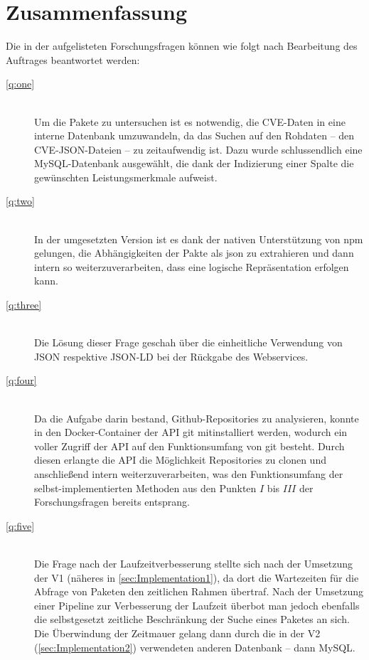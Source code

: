 \section{Zusammenfassung} \label{sec:Zusammenfassung}
    Die in der  aufgelisteten Forschungsfragen können wie folgt nach Bearbeitung des Auftrages beantwortet werden:
    \begin{description}
        \item[\ref{q:one}]\hfill \\
            Um die Pakete zu untersuchen ist es notwendig, die CVE-Daten in eine interne Datenbank umzuwandeln, da das Suchen auf den Rohdaten -- den CVE-\ac{JSON}-Dateien -- zu zeitaufwendig ist.
            Dazu wurde schlussendlich eine MySQL-Datenbank ausgewählt, die dank der Indizierung einer Spalte die gewünschten Leistungsmerkmale aufweist.
        \item[\ref{q:two}]\hfill \\
            In der umgesetzten Version ist es dank der nativen Unterstützung von npm gelungen, die Abhängigkeiten der Pakte als json zu extrahieren und dann intern so weiterzuverarbeiten, dass eine logische Repräsentation erfolgen kann.
        \item[\ref{q:three}]\hfill \\
            Die Lösung dieser Frage geschah über die einheitliche Verwendung von \ac{JSON} respektive \ac{JSON-LD} bei der Rückgabe des Webservices.
        \item[\ref{q:four}]\hfill \\
            Da die Aufgabe darin bestand, Github-Repositories zu analysieren, konnte in den Docker-Container der API git mitinstalliert werden, wodurch ein voller Zugriff der API auf den Funktionsumfang von git besteht.
            Durch diesen erlangte die \ac{API} die Möglichkeit Repositories zu clonen und anschließend intern weiterzuverarbeiten, was den Funktionsumfang der selbst-implementierten Methoden aus den Punkten $I$ bis $III$ der Forschungsfragen bereits entsprang.
        \item[\ref{q:five}]\hfill \\
            Die Frage nach der Laufzeitverbesserung stellte sich nach der Umsetzung der V1 (näheres in \ref{sec:Implementation1}), da dort die Wartezeiten für die Abfrage von Paketen den zeitlichen Rahmen übertraf.
            Nach der Umsetzung einer Pipeline zur Verbesserung der Laufzeit überbot man jedoch ebenfalls die selbstgesetzt zeitliche Beschränkung der Suche eines Paketes an sich.
            \\
            Die Überwindung der Zeitmauer gelang dann durch die in der V2 (\ref{sec:Implementation2}) verwendeten anderen Datenbank -- dann MySQL.
    \end{description}
